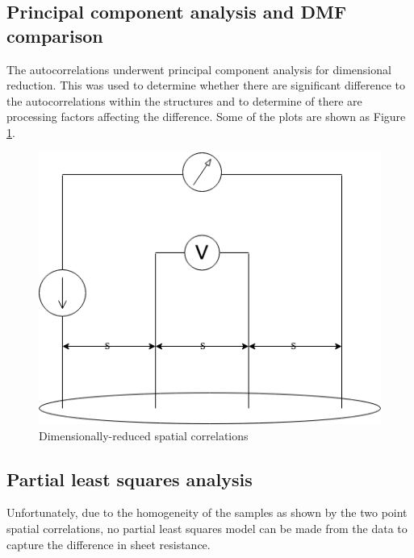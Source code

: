 \subsection{Principal component analysis and DMF comparison}

The autocorrelations underwent principal component analysis for dimensional reduction.
This was used to determine whether there are significant difference to the autocorrelations within the structures and to determine of there are processing factors affecting the difference.
Some of the plots are shown as Figure \ref{fig:pca}.

\begin{figure}
  \centering
  \includegraphics[scale=0.3]{FourPoint.png}
  \caption[Autocorrelations after PCA]{Dimensionally-reduced spatial correlations}
  \label{fig:pca}
\end{figure}

\subsection{Partial least squares analysis}

Unfortunately, due to the homogeneity of the samples as shown by the two point spatial correlations, no partial least squares model can be made from the data to capture the difference in sheet resistance.

